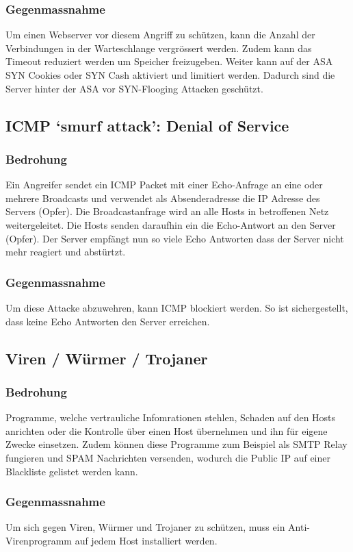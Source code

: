\documentclass[11pt,a4paper,parskip=half]{scrartcl}
\begin{document}
\subsubsection{Gegenmassnahme}
Um einen Webserver vor diesem Angriff zu schützen, kann die Anzahl der Verbindungen in der Warteschlange vergrössert werden. Zudem kann das Timeout reduziert werden um Speicher freizugeben. Weiter kann auf der ASA SYN Cookies oder SYN Cash aktiviert und limitiert werden. Dadurch sind die Server hinter der ASA vor SYN-Flooging Attacken geschützt.\\

\subsection{ICMP ‘smurf attack’: Denial of Service}
\subsubsection{Bedrohung}
Ein Angreifer sendet ein ICMP Packet mit einer Echo-Anfrage an eine oder mehrere Broadcasts und verwendet als Absenderadresse die IP Adresse des Servers (Opfer). Die Broadcastanfrage wird an alle Hosts in betroffenen Netz weitergeleitet. Die Hosts senden daraufhin ein die Echo-Antwort an den Server (Opfer). Der Server empfängt nun so viele Echo Antworten dass der Server nicht mehr reagiert und abstürtzt.
\subsubsection{Gegenmassnahme}
Um diese Attacke abzuwehren, kann ICMP blockiert werden. So ist sichergestellt, dass keine Echo Antworten den Server erreichen.

\subsection{Viren / Würmer / Trojaner}
\subsubsection{Bedrohung}
Programme, welche vertrauliche Infomrationen stehlen, Schaden auf den Hosts anrichten oder die Kontrolle über einen Host übernehmen und ihn für eigene Zwecke einsetzen. Zudem können diese Programme zum Beispiel als SMTP Relay fungieren und SPAM Nachrichten versenden, wodurch die Public IP auf einer Blackliste gelistet werden kann.
\subsubsection{Gegenmassnahme}
Um sich gegen Viren, Würmer und Trojaner zu schützen, muss ein Anti-Virenprogramm auf jedem Host installiert werden.
\end{document}
